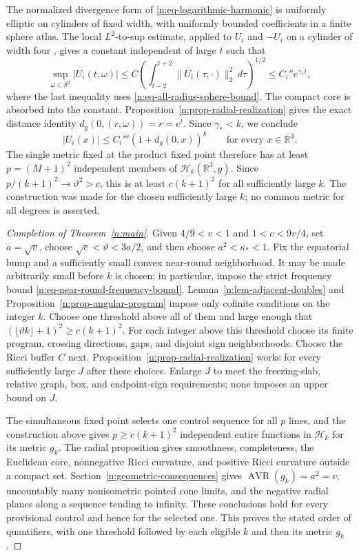 The normalized divergence form of
\eqref{n:eq-logarithmic-harmonic} is uniformly elliptic on cylinders of
fixed width, with uniformly bounded coefficients in a finite sphere atlas.
The local \(L^2\)-to-sup estimate, applied to \(U_i\) and \(-U_i\) on
a cylinder of width four
\cite[Theorem~8.17, p.~194, with \(p=2\)]{GilbargTrudinger}, gives a
constant independent of large \(t\) such that
\[
 \sup_{\omega\in S^2}|U_i(t,\omega)|
 \leq C\left(\int_{t-2}^{t+2}
          \|U_i(\tau,\cdot)\|_2^2\,d\tau\right)^{1/2}
 \leq C_i''e^{\gamma_* t},
\]
where the last inequality uses \eqref{n:eq-all-radius-sphere-bound}.
The compact core is absorbed into the constant.
Proposition~\ref{n:prop-radial-realization} gives the exact distance identity
\(d_g(0,(r,\omega))=r=e^t\).  Since \(\gamma_*<k\), we conclude
\[
 |U_i(x)|\leq C_i'''(1+d_g(0,x))^k
 \qquad\text{for every }x\in\mathbb R^3.
\]
The single metric fixed at the product fixed point therefore has at least
\(p=(M+1)^2\) independent members of \(\mathcal H_k(\mathbb R^3,g)\).
Since \(p/(k+1)^2\to\vartheta^2>c\), this is at least \(c(k+1)^2\)
for all sufficiently large \(k\).  The construction was
made for the chosen sufficiently large \(k\); no common metric for all
degrees is asserted.


\begin{proof}[Completion of Theorem~\ref{n:main}]
Given \(4/9<v<1\) and \(1<c<9v/4\), set \(a=\sqrt v\), choose
\(\sqrt c<\vartheta<3a/2\), and then choose \(a^2<\kappa_*<1\).
Fix the equatorial bump and a sufficiently small convex near-round
neighborhood. It may be made arbitrarily small before \(k\) is chosen;
in particular, impose the strict frequency bound
\eqref{n:eq-near-round-frequency-bound}.
Lemma~\ref{n:lem-adjacent-doubles} and
Proposition~\ref{n:prop-angular-program} impose only cofinite conditions
on the integer \(k\). Choose one threshold above all of them and large
enough that \((\lfloor\vartheta k\rfloor+1)^2\geq c(k+1)^2\).
For each integer above this threshold choose its finite program, crossing
directions, gaps, and disjoint sign neighborhoods. Choose the Ricci
buffer \(C\) next. Proposition~\ref{n:prop-radial-realization} works for
every sufficiently large \(J\) after these choices. Enlarge \(J\) to meet
the freezing-slab, relative graph, box, and endpoint-sign requirements;
none imposes an upper bound on \(J\).

The simultaneous fixed point selects one control sequence for all \(p\)
lines, and the construction above gives \(p\geq c(k+1)^2\) independent
entire functions in \(\mathcal H_k\) for its metric \(g_k\). The radial
proposition gives smoothness, completeness, the Euclidean core,
nonnegative Ricci curvature, and positive Ricci curvature outside a
compact set. Section~\ref{n:geometric-consequences} gives
\(\operatorname{AVR}(g_k)=a^2=v\), uncountably many nonisometric pointed
cone limits, and the negative radial planes along a sequence tending to
infinity. These conclusions hold for every provisional control and hence
for the selected one. This proves the stated order of quantifiers, with
one threshold followed by each eligible \(k\) and then its metric \(g_k\).
\end{proof}

